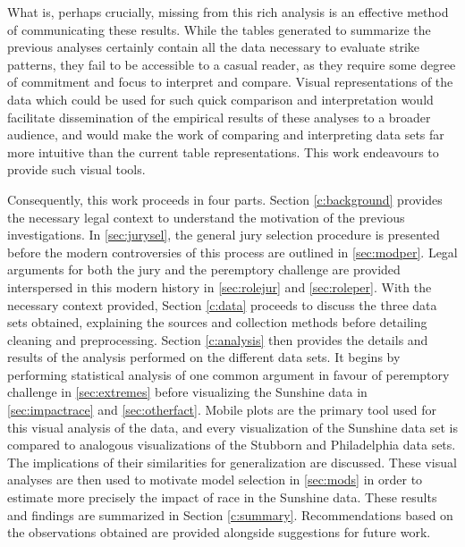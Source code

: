 What is, perhaps crucially, missing from this rich analysis is an effective method of communicating these results. While the
tables generated to summarize the previous analyses certainly contain
all the data necessary to evaluate strike patterns, they fail
to be accessible to a casual reader, as they require some degree of commitment and focus to interpret and compare. Visual
representations of the data which could be used for such quick
comparison and interpretation would facilitate dissemination of
the empirical results of these analyses to a broader audience, and would make the work of comparing and interpreting data sets far
more intuitive than the current table representations. This work endeavours to provide such visual tools.

Consequently, this work proceeds in four parts. Section \ref{c:background} provides the necessary legal context to understand the
motivation of the previous investigations. In \ref{sec:jurysel}, the general jury selection procedure is presented before the
modern controversies of this process are outlined in \ref{sec:modper}. Legal arguments for both the jury and the peremptory
challenge are provided interspersed in this modern history in \ref{sec:rolejur} and \ref{sec:roleper}. With the necessary context provided, Section \ref{c:data} proceeds to discuss the three data sets obtained, explaining the sources
and collection methods before detailing cleaning and
preprocessing. Section \ref{c:analysis} then provides the details and results
of the analysis performed on the different data sets. It begins by performing statistical analysis of one common argument in
favour of peremptory challenge in \ref{sec:extremes} before visualizing the Sunshine data in \ref{sec:impactrace} and
\ref{sec:otherfact}. Mobile plots are the primary tool used for this visual analysis of the data, and
every visualization of the Sunshine data set is compared to analogous visualizations of the Stubborn and Philadelphia data
sets. The implications of their similarities for generalization are discussed. These visual analyses are then used to motivate
model selection in \ref{sec:mods} in order to estimate more precisely the impact of race in the Sunshine data. These results and
findings are summarized in Section \ref{c:summary}. Recommendations based on the observations obtained are provided alongside suggestions for future work.
